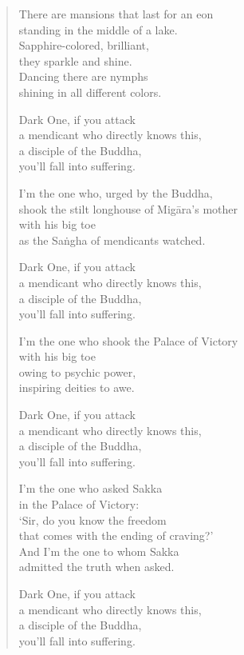 \documentclass[12pt,openany]{book}%
\begin{document}
\begin{verse}
There are mansions that last for an eon \\
standing in the middle of a lake. \\
Sapphire-colored, brilliant, \\
they sparkle and shine. \\
Dancing there are nymphs \\
shining in all different colors. 

Dark One, if you attack \\
a mendicant who directly knows this, \\
a disciple of the Buddha, \\
you’ll fall into suffering. 

I’m the one who, urged by the Buddha, \\
shook the stilt longhouse of \textsanskrit{Migāra}’s mother \\
with his big toe \\
as the \textsanskrit{Saṅgha} of mendicants watched. 

Dark One, if you attack \\
a mendicant who directly knows this, \\
a disciple of the Buddha, \\
you’ll fall into suffering. 

I’m the one who shook the Palace of Victory \\
with his big toe \\
owing to psychic power, \\
inspiring deities to awe. 

Dark One, if you attack \\
a mendicant who directly knows this, \\
a disciple of the Buddha, \\
you’ll fall into suffering. 

I’m the one who asked Sakka \\
in the Palace of Victory: \\
‘Sir, do you know the freedom \\
that comes with the ending of craving?’ \\
And I’m the one to whom Sakka \\
admitted the truth when asked. 

Dark One, if you attack \\
a mendicant who directly knows this, \\
a disciple of the Buddha, \\
you’ll fall into suffering. 


\end{verse}
\end{document}
